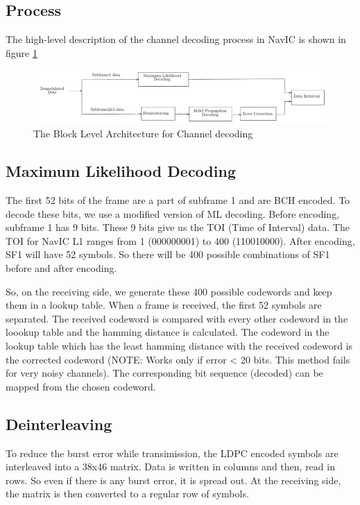 \subsection{Process}
The high-level description of the channel decoding process in NavIC is shown in figure \ref{fig:decoding_r}
\begin{normalsize}
\begin{figure}[ht]
\centering
\includegraphics[width=1.2\columnwidth]{figs/decoding_r}
\centering
\captionsetup{justification=centering}
\caption{The Block Level Architecture for Channel decoding}
\label{fig:decoding_r}
\end{figure}
\end{normalsize}


\subsection{Maximum Likelihood Decoding}
The first 52 bits of the frame are a part of subframe 1 and are BCH encoded. To decode these bits, we use a modified version of ML decoding. Before encoding, subframe 1 has 9 bits. These 9 bits give us the TOI (Time of Interval) data. The TOI for NavIC L1 ranges from 1 (000000001) to 400 (110010000). After encoding, SF1 will have 52 symbols. So there will be 400 possible combinations of SF1 before and after encoding. 

So, on the receiving side, we generate these 400 possible codewords and keep them in a lookup table. When a frame is received, the first 52 symbols are separated. The received codeword is compared with every other codeword in the loookup table and the hamming distance is calculated. The codeword in the lookup table which has the least hamming distance with the received codeword is the  corrected codeword (NOTE: Works only if error < 20 bits. This method fails for very noisy channels). The corresponding bit sequence (decoded) can be mapped from the chosen codeword.

\subsection{Deinterleaving}
To reduce the burst error while transimission, the LDPC encoded symbols are interleaved into a 38x46 matrix. Data is written in columns and then, read in rows. So even if there is any burst error, it is spread out. At the receiving side, the matrix is then converted to a regular row of symbols.

